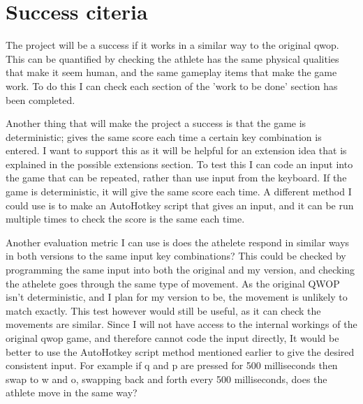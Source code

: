 \documentclass[12pt,a4paper,twoside]{article}
\begin{document}
\section*{Success citeria}



The project will be a success if it works in a similar way to the original qwop. This can be quantified by checking the athlete has the same physical qualities that make it seem human, and the same  gameplay items that make the game work. To do this I can check each section of the 'work to be done' section has been completed.

Another thing that will make the project a success is that the game is deterministic; gives the same score each time a certain key combination is entered. I want to support this as it will be helpful for an extension idea that is explained in the possible extensions section. 
To test this I can code an input into the game that can be repeated, rather than use input from the keyboard. If the game is deterministic, it will give the same score each time. A different method I could use is to make an AutoHotkey script that gives an input, and it can be run multiple times to check the score is the same each time.

Another evaluation metric I can use is does the athelete respond in similar ways in both versions to the same input key combinations? This could be checked by programming the same input into both the original and my version, and checking the athelete goes through the same type of movement. 
As the original QWOP isn't deterministic, and I plan for my version to be, the movement is unlikely to match exactly. This test however would still be useful, as it can check the movements are similar.
Since I will not have access to the internal workings of the original qwop game, and therefore cannot code the input directly, It would be better to use the AutoHotkey script method mentioned earlier to give the desired consistent input.
For example if q and p are pressed for 500 milliseconds then swap to w and o, swapping back and forth every 500 milliseconds, does the athlete move in the same way?
\end{document}
